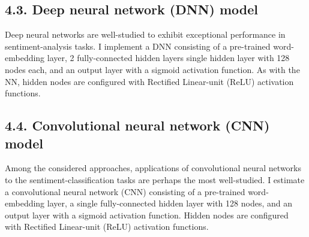 \subsection*{4.3. Deep neural network (DNN) model}
Deep neural networks are well-studied to exhibit exceptional performance in sentiment-analysis tasks. I implement a DNN consisting of a pre-trained word-embedding  layer, 2 fully-connected hidden layers single hidden layer with 128 nodes each, and an output layer with a sigmoid activation function. As with the NN, hidden nodes are configured with Rectified Linear-unit (ReLU) activation functions.

\subsection*{4.4. Convolutional neural network (CNN) model}
Among the considered approaches, applications of convolutional neural networks to the sentiment-classification tasks are perhaps the most well-studied. I estimate a convolutional neural network (CNN) consisting of a pre-trained word-embedding layer, a single fully-connected hidden layer with 128 nodes, and an output layer with a sigmoid activation function. Hidden nodes are configured with Rectified Linear-unit (ReLU) activation functions.

